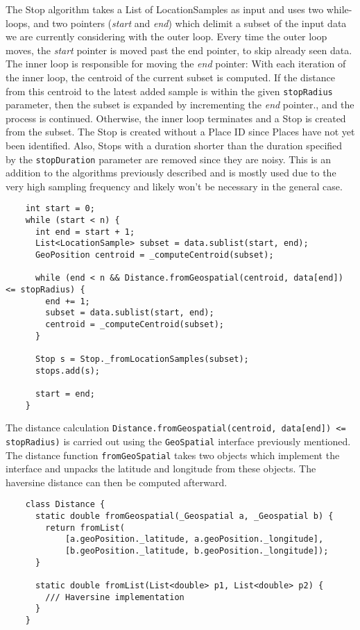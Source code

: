 The Stop algorithm takes a List of LocationSamples as input and uses two while-loops, and two pointers (\textit{start} and \textit{end}) which delimit a subset of the input data we are currently considering with the outer loop. Every time the outer loop moves, the \textit{start} pointer is moved past the end pointer, to skip already seen data. The inner loop is responsible for moving the \textit{end} pointer: With each iteration of the inner loop, the centroid of the current subset is computed. If the distance from this centroid to the latest added sample is within the given \verb|stopRadius| parameter, then the subset is expanded by incrementing the \textit{end} pointer., and the process is continued. Otherwise, the inner loop terminates and a Stop is created from the subset. The Stop is created without a Place ID since Places have not yet been identified. Also, Stops with a duration shorter than the duration specified by the \verb|stopDuration| parameter are removed since they are noisy. This is an addition to the algorithms previously described and is mostly used due to the very high sampling frequency and likely won't be necessary in the general case.

\begin{verbatim}
    int start = 0;
    while (start < n) {
      int end = start + 1;
      List<LocationSample> subset = data.sublist(start, end);
      GeoPosition centroid = _computeCentroid(subset);
        
      while (end < n && Distance.fromGeospatial(centroid, data[end]) <= stopRadius) {
        end += 1;
        subset = data.sublist(start, end);
        centroid = _computeCentroid(subset);
      }
    
      Stop s = Stop._fromLocationSamples(subset);
      stops.add(s);
    
      start = end;
    }
\end{verbatim}

The distance calculation \verb|Distance.fromGeospatial(centroid, data[end]) <= stopRadius)| is carried out using the \verb|GeoSpatial| interface previously mentioned. The distance function \verb|fromGeoSpatial| takes two objects which implement the interface and unpacks the latitude and longitude from these objects. The haversine distance can then be computed afterward.

\begin{verbatim}
    class Distance {
      static double fromGeospatial(_Geospatial a, _Geospatial b) {
        return fromList(
            [a.geoPosition._latitude, a.geoPosition._longitude],
            [b.geoPosition._latitude, b.geoPosition._longitude]);
      }
    
      static double fromList(List<double> p1, List<double> p2) {
        /// Haversine implementation
      }
    }
\end{verbatim}

